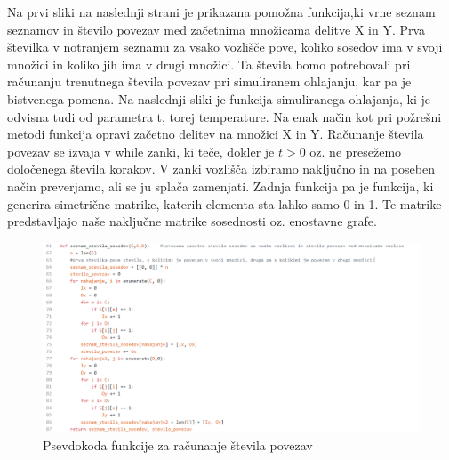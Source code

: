 \documentclass[12pt,a4paper]{amsart}
\theoremstyle{definition} %
\theoremstyle{plain} %
\begin{document}
Na prvi sliki na naslednji strani je prikazana pomožna funkcija,ki vrne seznam seznamov in število povezav med začetnima množicama delitve X in Y.  Prva številka v notranjem seznamu  za vsako vozlišče pove, koliko sosedov ima v svoji množici in koliko jih ima v drugi množici. Ta števila bomo potrebovali pri računanju trenutnega števila povezav pri simuliranem ohlajanju, kar pa je bistvenega pomena. Na naslednji sliki je funkcija simuliranega ohlajanja, ki je odvisna tudi od parametra t, torej temperature. Na enak način kot pri požrešni metodi funkcija opravi začetno delitev na množici X in Y. Računanje števila povezav se izvaja v while zanki, ki teče, dokler je $t>0$ oz. ne presežemo določenega števila korakov. V zanki vozlišča izbiramo naključno in na poseben način preverjamo, ali se ju splača zamenjati. Zadnja funkcija pa je funkcija, ki generira simetrične matrike, katerih elementa sta lahko samo 0 in 1. Te matrike predstavljajo naše naključne matrike sosednosti oz. enostavne grafe.
\newpage

\FloatBarrier
\begin{figure}
  \centering
  \includegraphics{seznam}
 \caption{Psevdokoda funkcije za računanje števila povezav}
\end{figure}
\FloatBarrier
\end{document}
